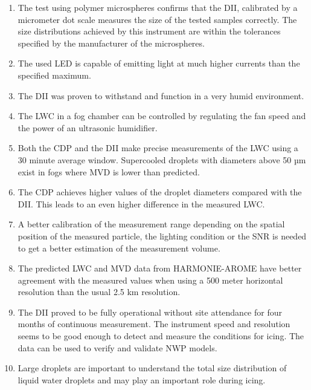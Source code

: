 \begin{enumerate}
\item
The test using polymer microspheres confirms that the DII, calibrated by a micrometer dot scale measures the size of the tested samples correctly. The size distributions achieved by this instrument are within the tolerances specified by the manufacturer of the microspheres.

\item
The used LED is capable of emitting light at much higher currents than the specified maximum.

\item
The DII was proven to withstand and function in a very humid environment. 

\item
The LWC in a fog chamber can be controlled by regulating the fan speed and the power of an ultrasonic humidifier. 

\item
Both the CDP and the DII make precise measurements of the LWC using a 30 minute average window. Supercooled droplets with diameters above 50 µm  exist in fogs where MVD is lower than predicted.

\item
The CDP achieves higher values of the droplet diameters compared with the DII. This leads to an even higher difference in the measured LWC.

\item
A better calibration of the measurement range depending on the spatial position of the measured particle, the lighting condition or the SNR is needed to get a better estimation of the measurement volume.

\item
The predicted LWC and MVD data from HARMONIE-AROME have better agreement with the measured values when using a 500 meter horizontal resolution than the usual 2.5 km resolution.

\item
The DII proved to be fully operational without site attendance for four months of continuous measurement. The instrument speed and resolution seems to be good enough to detect and measure the conditions for icing. The data can be used to verify and validate NWP models.

\item
Large droplets are important to understand the total size distribution of liquid water droplets and may play an important role during icing. 

\end{enumerate}

